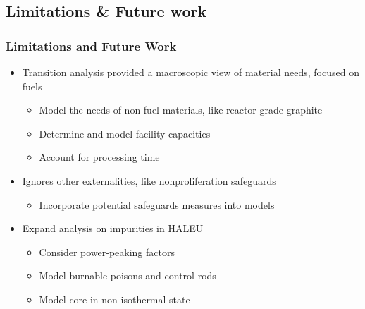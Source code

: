 \subsection{Limitations \& Future work}
\begin{frame}
      \frametitle{Limitations and Future Work}
      \begin{itemize}
            \item Transition analysis provided a macroscopic view of 
                  material needs, focused on fuels
            \begin{itemize}
                  \item<2-> Model the needs of non-fuel materials, 
                        like reactor-grade graphite
                  \item<2-> Determine and model facility capacities
                  \item<2-> Account for processing time 
            \end{itemize}
            \item<3-> Ignores other externalities, like nonproliferation
                    safeguards
            \begin{itemize}
                  \item<4-> Incorporate potential safeguards measures into models
            \end{itemize}
            \item<5-> Expand analysis on impurities in \gls{HALEU}
            \begin{itemize}
                  \item<6-> Consider power-peaking factors
                  \item<6-> Model burnable poisons and control rods 
                  \item<6-> Model core in non-isothermal state
            \end{itemize}
      \end{itemize} 
\end{frame}
